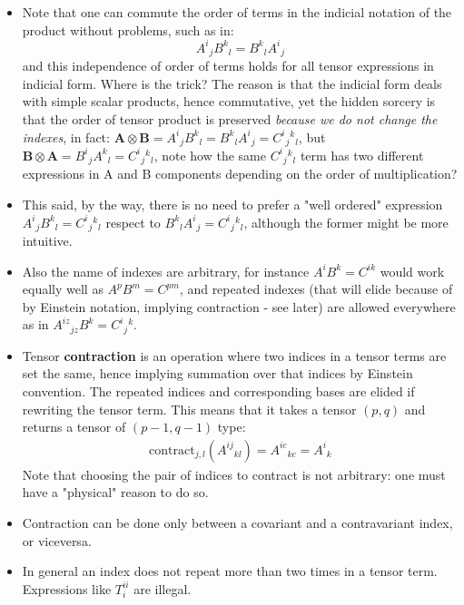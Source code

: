 \documentclass{digitaldynamics}
\def\tensor#1{\bm{#1}}
\begin{document}
\begin{itemize}
	\item Note that one can commute the order of terms in the indicial notation of the product without problems, such as in:
	\[
	   A^i{}_j B^k{}_l = B^k{}_l A^i{}_j 
	\]
	and this independence of order of terms holds for all tensor expressions in indicial form. Where is the trick? 
	The reason is that the indicial form deals with simple scalar products, hence commutative, yet the hidden sorcery is that the order of tensor  
	product is preserved \textit{because we do not change the indexes},
	in fact: $\tensor{A} \otimes \tensor{B} = A^i{}_j B^k{}_l = B^k{}_l A^i{}_j = C^{i}{}_j{}^k{}_l$, but 
	$\tensor{B} \otimes \tensor{A} = B^i{}_j A^k{}_l = C^{i}{}_j{}^k{}_l$, note how the same $C^{i}{}_j{}^k{}_l$ term has two different expressions in A and B 
	components depending on the order of multiplication?
	
	\item This said, by the way, there is no need to prefer a "well ordered" expression $A^i{}_j B^k{}_l = C^{i}{}_j{}^k{}_l$ respect to $B^k{}_l A^i{}_j = C^{i}{}_j{}^k{}_l$, although the former might be more intuitive. 
	
	\item Also the name of indexes are arbitrary, for instance $A^i B^k = C^{ik}$ would work equally well as $A^p B^m = C^{pm}$, and repeated indexes (that will elide because of by Einstein notation, implying contraction - see later) are allowed everywhere as in $A^{iz}{}_{jz} B^k = C^{i}{}_j{}^k$.
	
  \item Tensor \textbf{contraction} is an operation where two indices in a tensor terms are set the same, hence implying summation over that indices by Einstein convention. The repeated indices and corresponding bases are elided if rewriting the tensor term.
	This means that it takes a tensor $(p,q)$ and returns a tensor of $(p-1,q-1)$ type: 
	\begin{align}
	 \mathrm{contract}_{j,l}(A^{ij}{}_{kl}) = A^{ic}{}_{kc} = A^{i}{}_{k}
	\label{eq:tensorcontraction}
	\end{align}
	Note that choosing the pair of indices to contract is not arbitrary: one must have a "physical" reason to do so. 
	
	\item Contraction can be done only between a covariant and a contravariant index, or viceversa.
	
	\item In general an index does not repeat more than two times in a tensor term. Expressions like $T^{ii}_{i}$ are illegal.
	

\end{itemize}
\end{document}
